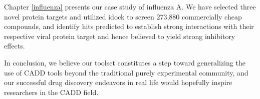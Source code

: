 Chapter \ref{influenza} presents our case study of influenza A. We have selected three novel protein targets and utilized idock \citep{1153,1362} to screen 273,880 commercially cheap compounds, and identify hits predicted to establish strong interactions with their respective viral protein target and hence believed to yield strong inhibitory effects.

In conclusion, we believe our toolset constitutes a step toward generalizing the use of CADD tools beyond the traditional purely experimental community, and our successful drug discovery endeavors in real life would hopefully inspire researchers in the CADD field.

\chapterend
